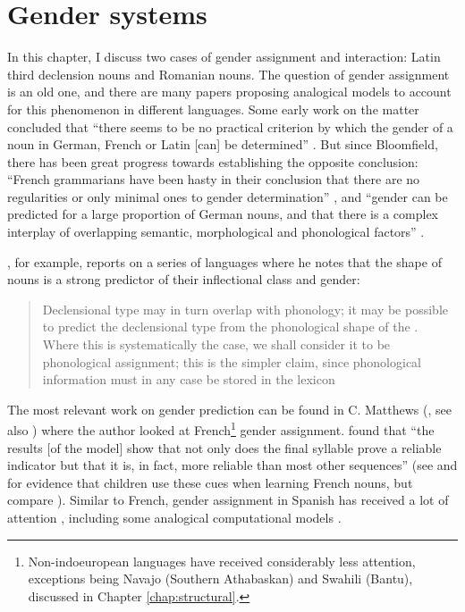 \chapter{Gender systems}\label{chap:gender-assignment}


In this chapter, I discuss two cases of gender assignment and  interaction: Latin third declension nouns and Romanian nouns. The question of gender assignment is an old one, and there are many papers proposing analogical models to account for this phenomenon in different languages. Some early work on the matter concluded that ``there seems to be no practical criterion by which the gender of a noun in German, French or Latin [can] be determined'' \autocite[280]{Bloomfield.1933a}. But since Bloomfield, there has been great progress towards establishing the opposite conclusion: ``French  grammarians  have  been  hasty  in  their  conclusion  that there are no regularities or only minimal ones to gender determination'' \autocite[316]{Tucker.1968}, and ``gender can be predicted for a large proportion of German nouns, and that there is a complex interplay of overlapping semantic, morphological and phonological factors'' \autocite[49]{Corbett.1991}.

\textcite{Corbett.1991}, for example, reports on a series of languages where he notes that the shape of nouns is a strong predictor of their inflectional class and gender:

\begin{quotation}
Declensional type may in turn overlap with phonology; it may be possible to predict the declensional type from the phonological shape of the . Where this is systematically the case, we shall consider it to be phonological assignment; this is the simpler claim, since phonological information must in any case be stored in the lexicon \autocite[34]{Corbett.1991}
\end{quotation}

The most relevant work on gender prediction can be found in C. Matthews (, see also \citealt{Lyster.2006}) where the author looked at French\footnote{Non-indoeuropean languages have received considerably less attention, exceptions being Navajo (Southern Athabaskan) \autocites{Eddington.2006, McDonough.2013} and Swahili (Bantu), discussed in Chapter \ref{chap:structural}.} gender assignment. \textcite[879]{Matthews.2010} found that ``the results [of the model] show that not only does the final syllable prove a reliable indicator but that it is, in fact, more reliable than most other sequences'' (see \textcite{Marchal.2007} and \textcite{Seigneuric.2007} for evidence that children use these cues when learning French nouns, but compare \textcite{Boloh.2010}). Similar to French, gender assignment in Spanish has received a lot of attention \autocite{Morin.2006, Sanchez.1995, Smead.2000}, including some analogical computational models \autocite{Eddington.2002}.

